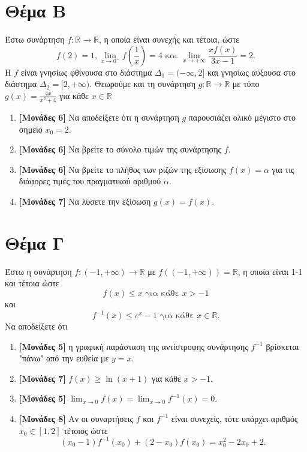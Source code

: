 \documentclass[12pt]{article}
\begin{document}
\section*{Θέμα Β}
  \noindent
  Έστω συνάρτηση $f:\mathbb{R}\to\mathbb{R}$, η οποία είναι συνεχής και τέτοια, ώστε
  $$f(2)=1, \lim_{x\to0^-}f(\frac{1}{x})=4 \text{ και } \lim_{x\to +\infty}\frac{xf(x)}{3x-1}=2.$$
  Η $f$ είναι γνησίως φθίνουσα στο διάστημα $Δ_1=(-\infty,2]$ και γνησίως αύξουσα στο διάστημα $Δ_2=[2,+\infty)$.
  Θεωρούμε και τη συνάρτηση $g:\mathbb{R}\to\mathbb{R}$ με τύπο $g(x)=\frac{4x}{x^2+4}$ για κάθε $x\in\mathbb{R}$
  \begin{enumerate}
    \item \textbf{[Μονάδες 6]} Να αποδείξετε ότι η συνάρτηση $g$ παρουσιάζει ολικό μέγιστο στο σημείο $x_0=2$.
    \item \textbf{[Μονάδες 6]} Να βρείτε το σύνολο τιμών της συνάρτησης $f$.
    \item \textbf{[Μονάδες 6]} Να βρείτε το πλήθος των ριζών της εξίσωσης $f(x)=α$ για τις διάφορες τιμές του πραγματικού αριθμού $α$.
    \item \textbf{[Μονάδες 7]} Να λύσετε την εξίσωση $g(x)=f(x)$.
  \end{enumerate}

\section*{Θέμα Γ}
  \noindent
  Έστω η συνάρτηση $f:(-1,+\infty)\to\mathbb{R}$ με $f\left((-1,+\infty)\right)=\mathbb{R}$, η οποία είναι 1-1 και τέτοια ώστε
  $$f(x)\le x \text{ για κάθε } x>-1$$
  και
  $$f^{-1}(x)\le e^x-1 \text{ για κάθε } x\in\mathbb{R}.$$
  Να αποδείξετε ότι
  \begin{enumerate}
    \item \textbf{[Μονάδες 5]} η γραφική παράσταση της αντίστροφης συνάρτησης $f^{-1}$ βρίσκεται "πάνω" από την ευθεία με $y=x$.
    \item \textbf{[Μονάδες 7]} $f(x)\ge \ln(x+1)$ για κάθε $x>-1$.
    \item \textbf{[Μονάδες 5]} $\lim_{x\to 0}f(x)=\lim_{x\to 0}f^{-1}(x)=0$.
    \item \textbf{[Μονάδες 8]} Αν οι συναρτήσεις $f$ και $f^{-1}$ είναι συνεχείς, τότε υπάρχει αριθμός $x_0\in [1,2]$ τέτοιος ώστε
    $$(x_0-1)f^{-1}(x_0)+(2-x_0)f(x_0)=x_0^2-2x_0+2.$$
  \end{enumerate}
\end{document}
